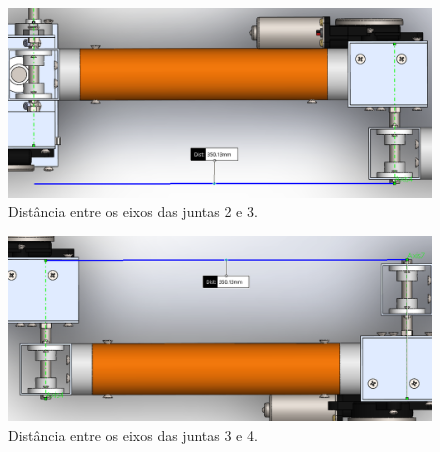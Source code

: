 \begin{figure}[ht]
    \caption{Distância entre os eixos das juntas 2 e 3.}    
    \begin{centering}

        \includegraphics[width=1\columnwidth]{images/a2.png}
    
    \par\end{centering}

    \label{fig:a2}
\end{figure}

\begin{figure}[ht]
    \caption{Distância entre os eixos das juntas 3 e 4.}    
    \begin{centering}

        \includegraphics[width=1\columnwidth]{images/a3.png}
    
    \par\end{centering}

    \label{fig:a3}
\end{figure}

